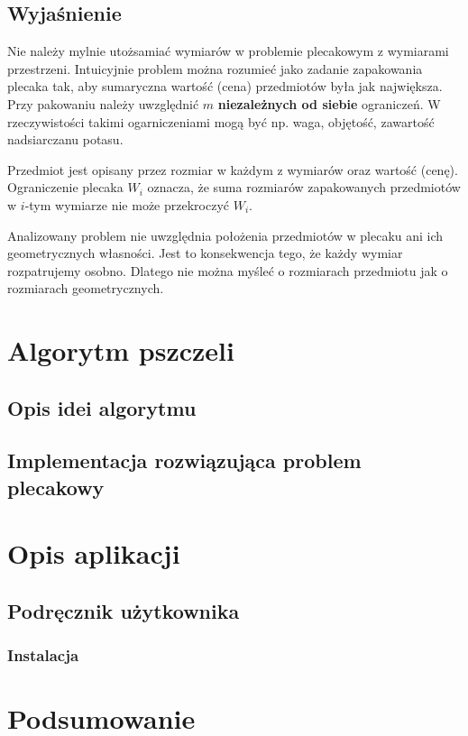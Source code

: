 \documentclass[a4paper,12pt,notitlepage]{mwrep}
\begin{document}
\section{Wyjaśnienie}
Nie należy mylnie utożsamiać wymiarów w problemie plecakowym z 
wymiarami przestrzeni. Intuicyjnie problem można rozumieć jako zadanie
zapakowania plecaka tak, aby sumaryczna wartość (cena)
przedmiotów była jak największa.
Przy pakowaniu należy uwzględnić $m$ \textbf{niezależnych od siebie}
ograniczeń. W rzeczywistości takimi ogarniczeniami mogą być np. waga,
objętość, zawartość nadsiarczanu potasu.

Przedmiot jest opisany przez
rozmiar w każdym z wymiarów oraz wartość (cenę). Ograniczenie plecaka
$W_i$ oznacza, że suma rozmiarów zapakowanych przedmiotów w $i$-tym
wymiarze nie może przekroczyć $W_i$.

Analizowany problem nie uwzględnia położenia przedmiotów w plecaku
ani ich geometrycznych własności. Jest to konsekwencja tego, że każdy
wymiar rozpatrujemy osobno. Dlatego nie można myśleć o rozmiarach
przedmiotu jak o rozmiarach geometrycznych.

\chapter{Algorytm pszczeli}
\section{Opis idei algorytmu}
\section{Implementacja rozwiązująca problem plecakowy}

\chapter{Opis aplikacji}
\section{Podręcznik użytkownika}
\subsection{Instalacja}

\chapter{Podsumowanie}
\end{document}
